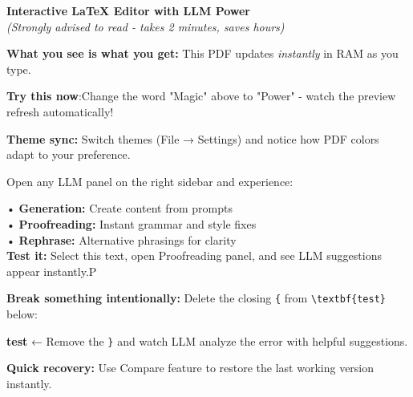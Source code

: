 \documentclass[12pt,a4paper]{article}
\begin{document}
\begin{tcolorbox}[colback=green!8!white,colframe=green!50!black,title=\Huge AutomaTeX Quick Tour,sharp corners]
\begin{center}
\Large \textbf{Interactive LaTeX Editor with LLM Power} \\
\vspace{0.3cm}
\normalsize \textit{(Strongly advised to read - takes 2 minutes, saves hours)}
\end{center}
\end{tcolorbox}


\vspace{0.8cm}

\begin{tcolorbox}[colback=blue!5!white,colframe=blue!40!black,title=\textbf{Live Preview Magic},left=5mm,right=5mm]
\textbf{What you see is what you get:} This PDF updates \textit{instantly} in RAM as you type.

\textbf{Try this now}:Change the word "Magic" above to "Power" - watch the preview refresh automatically!

\textbf{Theme sync:} Switch themes (File → Settings) and notice how PDF colors adapt to your preference.
\end{tcolorbox}

\vspace{0.5cm}

\begin{tcolorbox}[colback=orange!8!white,colframe=orange!50!black,title=\textbf{LLM Assistant Sidebar},left=5mm,right=5mm]
Open any LLM panel on the right sidebar and experience:

• \textbf{Generation:} Create content from prompts \\
• \textbf{Proofreading:} Instant grammar and style fixes \\
• \textbf{Rephrase:} Alternative phrasings for clarity \\

\textbf{Test it:} Select this text, open Proofreading panel, and see LLM suggestions appear instantly.P
\end{tcolorbox}

\vspace{0.5cm}

\begin{tcolorbox}[colback=red!8!white,colframe=red!40!black,title=\textbf{Smart Error Detection},left=5mm,right=5mm]
\textbf{Break something intentionally:} Delete the closing \verb|{| from \verb|\textbf{test}| below:

\textbf{test} ← Remove the \verb|}| and watch LLM analyze the error with helpful suggestions.

\textbf{Quick recovery:} Use Compare feature to restore the last working version instantly.
\end{tcolorbox}
\end{document}
